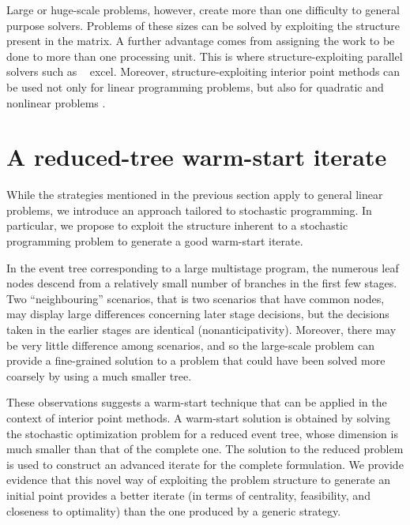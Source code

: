 \hrulefill

Large or huge-scale problems, however, create more than one difficulty 
to general purpose solvers. Problems of these sizes can be solved by 
exploiting the structure present in the matrix. A further advantage 
comes from assigning the work to be done to more than one processing unit. 
This is where structure-exploiting parallel solvers such as \OOPS\ 
\cite{GondzioSarkissian} excel. Moreover, structure-exploiting interior 
point methods can be used not only for linear programming problems, 
but also for quadratic and nonlinear problems \cite{GondzioGrothey04}.


%
%
\section{A reduced-tree warm-start iterate}
\label{sec:ReducedTree}

While the strategies mentioned in the previous section apply to
general linear problems, we introduce an approach tailored to
stochastic programming. In particular, we propose to exploit the structure
inherent to a stochastic programming problem to generate a good 
warm-start iterate.

In the event tree corresponding to a large multistage program, 
the numerous leaf nodes descend from a relatively small number of 
branches in the first few stages. Two ``neighbouring'' scenarios, 
that is two scenarios that have common nodes, may display large 
differences concerning later stage decisions, but the decisions 
taken in the earlier stages are identical (nonanticipativity).
Moreover, there may be very little difference among 
scenarios, and so the large-scale problem can provide a fine-grained 
solution to a problem that could have been solved more coarsely by 
using a much smaller tree. 

These observations suggests a
warm-start technique that can be applied in the context of interior 
point methods. A warm-start solution is obtained by solving the 
stochastic optimization problem for a reduced event tree, whose 
dimension is much smaller than that of the complete one. The solution 
to the reduced problem is used to construct an advanced iterate for 
the complete formulation. We provide evidence that this novel way 
of exploiting the problem structure to generate an initial point 
provides a better iterate (in terms of centrality, feasibility, 
and closeness to optimality) than the one produced by a generic 
strategy.

